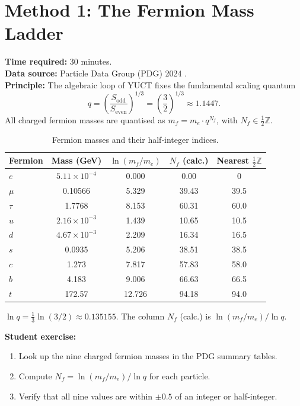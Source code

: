 \documentclass[12pt,a4paper]{article}
\newcommand{\Sodd}{S_{\mathrm{odd}}}
\newcommand{\Seven}{S_{\mathrm{even}}}
\begin{document}
	\section{Method 1: The Fermion Mass Ladder}
	\label{sec:massladder}
	
	\textbf{Time required:} 30 minutes.\\
	\textbf{Data source:} Particle Data Group (PDG) 2024 \cite{PDG2024}.\\
	\textbf{Principle:} The algebraic loop of YUCT fixes the fundamental
	scaling quantum
	\[
	q = \left( \frac{\Sodd}{\Seven} \right)^{1/3} = \left( \frac{3}{2} \right)^{1/3} \approx 1.1447.
	\]
	All charged fermion masses are quantised as \(m_f = m_e \cdot q^{N_f}\),
	with \(N_f \in \frac{1}{2}\mathbb{Z}\).
	
	\begin{table}[H]
		\centering
		\caption{Fermion masses and their half‑integer indices.}
		\label{tab:fermions}
		\begin{tabular}{l c c c c}
			\toprule
			Fermion & Mass (GeV) & \(\ln(m_f/m_e)\) & \(N_f\) (calc.) & Nearest \(\frac{1}{2}\mathbb{Z}\) \\
			\midrule
			\(e\)   & \(5.11\times10^{-4}\) & 0.000  & 0.00  & 0 \\
			\(\mu\)  & 0.10566 & 5.329  & 39.43 & 39.5 \\
			\(\tau\) & 1.7768  & 8.153  & 60.31 & 60.0 \\
			\(u\)   & \(2.16\times10^{-3}\) & 1.439  & 10.65 & 10.5 \\
			\(d\)   & \(4.67\times10^{-3}\) & 2.209  & 16.34 & 16.5 \\
			\(s\)   & 0.0935  & 5.206  & 38.51 & 38.5 \\
			\(c\)   & 1.273   & 7.817  & 57.83 & 58.0 \\
			\(b\)   & 4.183   & 9.006  & 66.63 & 66.5 \\
			\(t\)   & 172.57  & 12.726 & 94.18 & 94.0 \\
			\bottomrule
		\end{tabular}
		\par\smallskip
		\footnotesize
		\(\ln q = \frac{1}{3}\ln(3/2) \approx 0.135155\).  The column
		\(N_f\) (calc.) is \(\ln(m_f/m_e)/\ln q\).
	\end{table}
	
	\textbf{Student exercise:}
	\begin{enumerate}[label=(\arabic*)]
		\item Look up the nine charged fermion masses in the PDG summary tables.
		\item Compute \(N_f = \ln(m_f / m_e) / \ln q\) for each particle.
		\item Verify that all nine values are within \(\pm 0.5\) of an integer
		or half‑integer.
	\end{enumerate}
	
\end{document}
